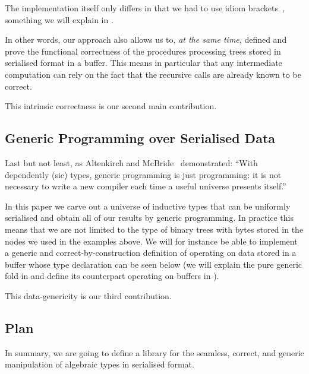 The implementation itself only differs in that we had to use idiom
brackets~\citep{DBLP:journals/jfp/McbrideP08}, something we will explain
in .

In other words, our approach also allows us to, \emph{at the same time},
defined and prove the functional correctness of the 
procedures processing trees stored in serialised format in a buffer.
This means in particular that any intermediate computation can rely
on the fact that the recursive calls are already known to be correct.

This intrinsic correctness is our second main contribution.

\subsection{Generic Programming over Serialised Data}

Last but not least,
as Altenkirch and McBride~\citeyearpar{DBLP:conf/ifip2-1/AltenkirchM02}
demonstrated:
``With dependently (sic) types, generic programming is just programming:
it is not necessary to write a new compiler each time a useful
universe presents itself.''

In this paper we carve out a universe of inductive types that can be
uniformly serialised and obtain all of our results by generic programming.
%
In practice this means that we are not limited to the type of binary trees
with bytes stored in the nodes we used in the examples above.
%
We will for instance be able to implement
a generic and correct-by-construction
definition of  operating on data stored in a buffer
whose type declaration can be seen below
(we will explain the pure generic fold in 
and define its counterpart operating on buffers in ).


This data-genericity is our third contribution.

\subsection{Plan}

In summary, we are going to define a library for the
seamless,
correct,
and generic
manipulation of algebraic types in serialised format.


